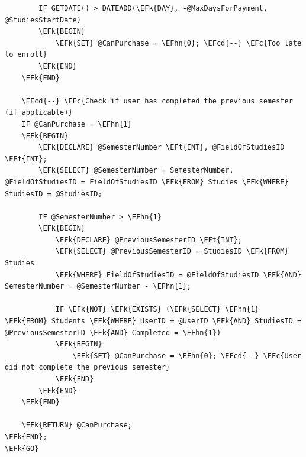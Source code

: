 \documentclass[11pt]{article}
\newcommand{\EFc}[1]{\textcolor{EFc}{\textit{#1}}} %
\newcommand{\EFcd}[1]{\textcolor{EFcd}{\textit{#1}}} %
\newcommand{\EFk}[1]{\textcolor{EFk}{\textbf{#1}}} %
\newcommand{\EFt}[1]{\textcolor{EFt}{\textbf{#1}}} %
\newcommand{\EFhn}[1]{\textcolor{EFhn}{#1}} %
\begin{document}
\begin{Code}
\begin{Verbatim}
        IF GETDATE() > DATEADD(\EFk{DAY}, -@MaxDaysForPayment, @StudiesStartDate)
        \EFk{BEGIN}
            \EFk{SET} @CanPurchase = \EFhn{0}; \EFcd{--} \EFc{Too late to enroll}
        \EFk{END}
    \EFk{END}

    \EFcd{--} \EFc{Check if user has completed the previous semester (if applicable)}
    IF @CanPurchase = \EFhn{1}
    \EFk{BEGIN}
        \EFk{DECLARE} @SemesterNumber \EFt{INT}, @FieldOfStudiesID \EFt{INT};
        \EFk{SELECT} @SemesterNumber = SemesterNumber, @FieldOfStudiesID = FieldOfStudiesID \EFk{FROM} Studies \EFk{WHERE} StudiesID = @StudiesID;

        IF @SemesterNumber > \EFhn{1}
        \EFk{BEGIN}
            \EFk{DECLARE} @PreviousSemesterID \EFt{INT};
            \EFk{SELECT} @PreviousSemesterID = StudiesID \EFk{FROM} Studies 
            \EFk{WHERE} FieldOfStudiesID = @FieldOfStudiesID \EFk{AND} SemesterNumber = @SemesterNumber - \EFhn{1};

            IF \EFk{NOT} \EFk{EXISTS} (\EFk{SELECT} \EFhn{1} \EFk{FROM} Students \EFk{WHERE} UserID = @UserID \EFk{AND} StudiesID = @PreviousSemesterID \EFk{AND} Completed = \EFhn{1})
            \EFk{BEGIN}
                \EFk{SET} @CanPurchase = \EFhn{0}; \EFcd{--} \EFc{User did not complete the previous semester}
            \EFk{END}
        \EFk{END}
    \EFk{END}

    \EFk{RETURN} @CanPurchase;
\EFk{END};
\EFk{GO}
\end{Verbatim}
\end{Code}
\end{document}
